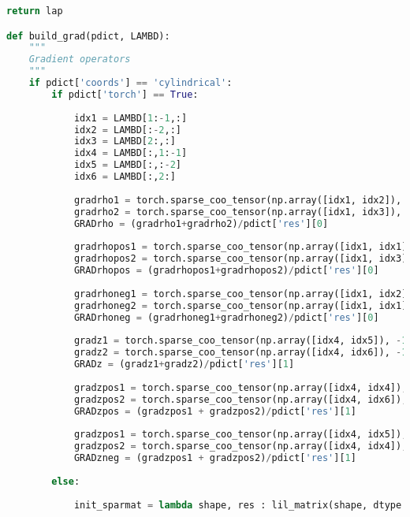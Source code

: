 \begin{lstlisting}[frame=single, language=Python]
    return lap

def build_grad(pdict, LAMBD):
    """
    Gradient operators 
    """
    if pdict['coords'] == 'cylindrical': 
        if pdict['torch'] == True:
            
            idx1 = LAMBD[1:-1,:]
            idx2 = LAMBD[:-2,:]
            idx3 = LAMBD[2:,:]
            idx4 = LAMBD[:,1:-1]
            idx5 = LAMBD[:,:-2]
            idx6 = LAMBD[:,2:]
            
            gradrho1 = torch.sparse_coo_tensor(np.array([idx1, idx2]), -1/2, op_shape, dtype=pdict['bitres'])
            gradrho2 = torch.sparse_coo_tensor(np.array([idx1, idx3]), -1/2, op_shape, dtype=pdict['bitres'])
            GRADrho = (gradrho1+gradrho2)/pdict['res'][0]
            
            gradrhopos1 = torch.sparse_coo_tensor(np.array([idx1, idx1]), -1, op_shape, dtype=pdict['bitres'])
            gradrhopos2 = torch.sparse_coo_tensor(np.array([idx1, idx3]), -1, op_shape, dtype=pdict['bitres'])
            GRADrhopos = (gradrhopos1+gradrhopos2)/pdict['res'][0]
            
            gradrhoneg1 = torch.sparse_coo_tensor(np.array([idx1, idx2]), -1, op_shape, dtype=pdict['bitres'])
            gradrhoneg2 = torch.sparse_coo_tensor(np.array([idx1, idx1]), -1, op_shape, dtype=pdict['bitres'])
            GRADrhoneg = (gradrhoneg1+gradrhoneg2)/pdict['res'][0]
            
            gradz1 = torch.sparse_coo_tensor(np.array([idx4, idx5]), -1/2, op_shape, dtype=pdict['bitres'])
            gradz2 = torch.sparse_coo_tensor(np.array([idx4, idx6]), -1/2, op_shape, dtype=pdict['bitres'])
            GRADz = (gradz1+gradz2)/pdict['res'][1]
            
            gradzpos1 = torch.sparse_coo_tensor(np.array([idx4, idx4]), -1, op_shape, dtype=pdict['bitres'])
            gradzpos2 = torch.sparse_coo_tensor(np.array([idx4, idx6]), 1, op_shape, dtype=pdict['bitres'])
            GRADzpos = (gradzpos1 + gradzpos2)/pdict['res'][1]
            
            gradzpos1 = torch.sparse_coo_tensor(np.array([idx4, idx5]), -1, op_shape, dtype=pdict['bitres'])
            gradzpos2 = torch.sparse_coo_tensor(np.array([idx4, idx4]), 1, op_shape, dtype=pdict['bitres'])
            GRADzneg = (gradzpos1 + gradzpos2)/pdict['res'][1]
            
        else:
            
            init_sparmat = lambda shape, res : lil_matrix(shape, dtype = res)
            

\end{lstlisting}
